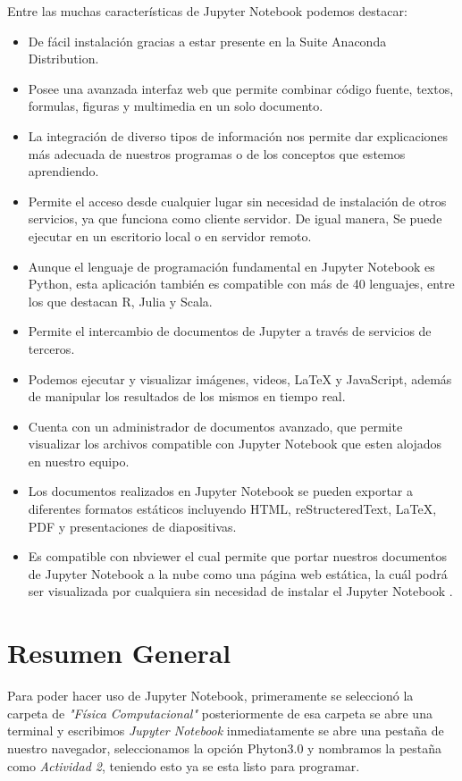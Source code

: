 \documentclass[12pt]{article}
\begin{document}
Entre las muchas características de Jupyter Notebook podemos destacar:
\begin{itemize}
\item De fácil instalación gracias a estar presente en la Suite Anaconda Distribution.
\item Posee una avanzada interfaz web que permite combinar código fuente, textos, formulas, figuras y multimedia en un solo documento.
\item La integración de diverso tipos de información nos permite dar explicaciones más adecuada de nuestros programas o de los conceptos que estemos aprendiendo.
\item Permite el acceso desde cualquier lugar sin necesidad de instalación de otros servicios, ya que funciona como cliente servidor. De igual manera, Se puede ejecutar en un escritorio local o en servidor remoto.
\item Aunque el lenguaje de programación fundamental en Jupyter Notebook es Python, esta aplicación también es compatible con más de 40 lenguajes, entre los que destacan R, Julia y Scala.
\item Permite el intercambio de documentos de Jupyter a través de servicios de terceros.
\item Podemos ejecutar y visualizar imágenes, videos, LaTeX y JavaScript, además de manipular los resultados de los mismos en tiempo real.
\item Cuenta con un administrador de documentos avanzado, que permite visualizar los archivos compatible con Jupyter Notebook que esten alojados en nuestro equipo.
\item Los documentos realizados en Jupyter Notebook se pueden exportar a diferentes formatos estáticos incluyendo HTML, reStructeredText, LaTeX, PDF y presentaciones de diapositivas.
\item Es compatible con nbviewer el cual permite que portar nuestros documentos de Jupyter Notebook a la nube como una página web estática, la cuál podrá ser visualizada por cualquiera sin necesidad de instalar el Jupyter Notebook .
\end{itemize}

\section{Resumen General}
Para poder hacer uso de Jupyter Notebook, primeramente se seleccionó la carpeta de \textit{"Física Computacional"} posteriormente de esa carpeta se abre una terminal y escribimos \textit{Jupyter Notebook} inmediatamente se abre una pestaña de nuestro navegador, seleccionamos la opción Phyton3.0 y nombramos la pestaña como \textit{Actividad 2}, teniendo esto ya se esta listo para programar.\\
\end{document}
